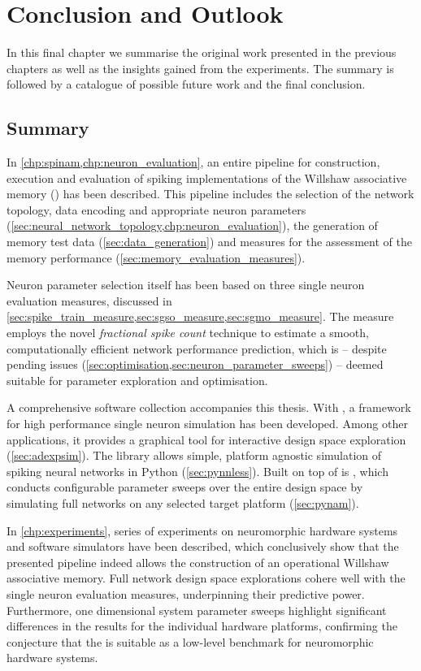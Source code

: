 \chapter{Conclusion and Outlook}
\label{chp:conclusion}


In this final chapter we summarise the original work presented in the previous chapters as well as the insights gained from the experiments. The summary is followed by a catalogue of possible future work and the final conclusion.

\section{Summary}

In \cref{chp:spinam,chp:neuron_evaluation}, an entire pipeline for construction, execution and evaluation of spiking implementations of the Willshaw associative memory (\BiNAM) has been described. This pipeline includes the selection of the network topology, data encoding and appropriate neuron parameters (\cref{sec:neural_network_topology,chp:neuron_evaluation}), the generation of memory test data (\cref{sec:data_generation}) and measures for the assessment of the memory performance (\cref{sec:memory_evaluation_measures}).

Neuron parameter selection itself has been based on three single neuron evaluation measures, discussed in \cref{sec:spike_train_measure,sec:sgso_measure,sec:sgmo_measure}. The \SGMO measure employs the novel \emph{fractional spike count} technique to estimate a smooth, computationally efficient network performance prediction, which is -- despite pending issues (\cref{sec:optimisation,sec:neuron_parameter_sweeps}) -- deemed suitable for parameter exploration and optimisation.

A comprehensive software collection accompanies this thesis. With \AdExpSim, a framework for high performance single neuron simulation has been developed. Among other applications, it provides a graphical tool for interactive design space exploration (\cref{sec:adexpsim}). The \mbox{\PyNNLess} library allows simple, platform agnostic simulation of spiking neural networks in Python (\cref{sec:pynnless}). Built on top of \PyNNLess is \PyNAM, which conducts configurable parameter sweeps over the entire design space by simulating full \BiNAM networks on any selected target platform (\cref{sec:pynam}).

In \cref{chp:experiments}, series of experiments on neuromorphic hardware systems and software simulators have been described, which conclusively show that the presented pipeline indeed allows the construction of an operational Willshaw associative memory. Full network design space explorations cohere well with the single neuron evaluation measures, underpinning their predictive power. Furthermore, one dimensional system parameter sweeps highlight significant differences in the results for the individual hardware platforms, confirming the conjecture that the \BiNAM is suitable as a low-level benchmark for neuromorphic hardware systems.

